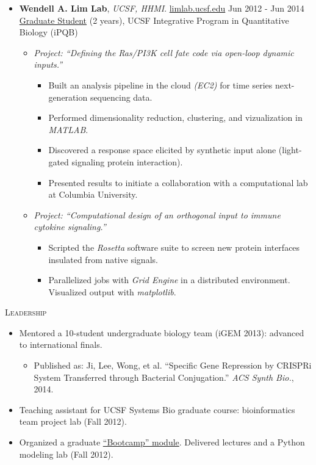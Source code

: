 \documentclass[10pt,letterpaper]{article}
\begin{document}
\begin{minipage}{0.95\textwidth}
    \begin{itemize}
        \item \textbf{Wendell A. Lim Lab}, \emph{UCSF, HHMI}. \href{http://limlab.ucsf.edu}{limlab.ucsf.edu} \hfill{Jun 2012 - Jun 2014}\\
              \underline{Graduate Student} (2 years), UCSF Integrative Program in Quantitative Biology (iPQB)
        \begin{itemize}
            \item \emph{Project: ``Defining the Ras/PI3K cell fate code via open-loop dynamic inputs.''}
            \begin{itemize}
                \item Built an analysis pipeline in the cloud {\small \textit{(EC2)}} for time series next-generation sequencing data.
                \item Performed dimensionality reduction, clustering, and vizualization in {\small \textit{MATLAB}}.
                \item Discovered a response space elicited by synthetic input alone (light-gated signaling protein interaction).
                \item Presented results to initiate a collaboration with a computational lab at Columbia University.
            \end{itemize}
            \item \emph{Project: ``Computational design of an orthogonal input to immune cytokine signaling.''}
            \begin{itemize}
                \item Scripted the \emph{Rosetta} software suite to screen new protein interfaces insulated from native signals.
                \item Parallelized jobs with \emph{Grid Engine} in a distributed environment. Visualized output with \emph{matplotlib}.
            \end{itemize}
        \end{itemize}
    \end{itemize}
\medbreak
\end{minipage}
{\Large\textsc{Leadership}} \smallbreak
\begin{itemize}
    \item Mentored a 10-student undergraduate biology team (iGEM 2013): advanced to international finals.
    \begin{itemize}[leftmargin=1.5em]
          \item Published as: Ji, Lee, Wong, et al. ``Specific Gene Repression by CRISPRi System Transferred through Bacterial Conjugation.'' \emph{ACS Synth Bio.}, 2014.
    \end{itemize}
    \item Teaching assistant for UCSF Systems Bio graduate course: bioinformatics team project lab (Fall 2012).
    \item Organized a graduate \href{https://sites.google.com/site/ipqbbootcamp2012/systems-biology}{``Bootcamp'' module}. Delivered lectures and a Python modeling lab (Fall 2012).
\end{itemize}
\end{document}
